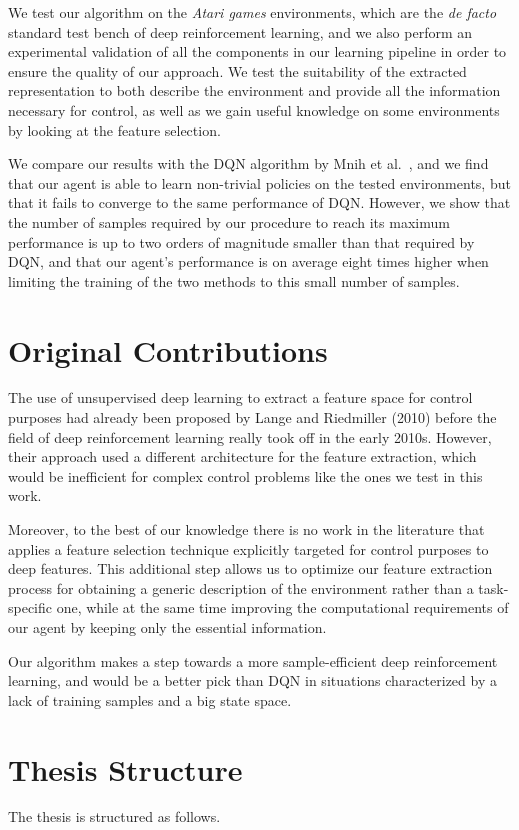 We test our algorithm on the \textit{Atari games} environments, which are
the \textit{de facto} standard test bench of deep reinforcement learning, and we 
also perform an experimental validation of all the components in our learning 
pipeline in order to ensure the quality of our approach.
We test the suitability of the extracted representation to both describe the 
environment and provide all the information necessary for control, as well as 
we gain useful knowledge on some environments by looking at the feature 
selection.

We compare our results with the DQN algorithm by Mnih et al.\ \cite{mnih2015human},
and we find that our agent is able to learn non-trivial policies on the tested 
environments, but that it fails to converge to the same performance of DQN. 
However, we show that the number of samples required by our procedure to reach 
its maximum performance is up to two orders of magnitude smaller than that 
required by DQN, and that our agent's performance is on average eight times 
higher when limiting the training of the two methods to this small number of 
samples.

\section{Original Contributions}
The use of unsupervised deep learning to extract a feature space for control 
purposes had already been proposed by Lange and Riedmiller (2010) \cite{lange2010deep} 
before the field of deep reinforcement learning really took off in the early 
2010s. 
However, their approach used a different architecture for the feature extraction, 
which would be inefficient for complex control problems like the ones we test
in this work. 

Moreover, to the best of our knowledge there is no work in the literature that
applies a feature selection technique explicitly targeted for control purposes
to deep features. 
This additional step allows us to optimize our feature extraction process for 
obtaining a generic description of the environment rather than a task-specific 
one, while at the same time improving the computational requirements of our 
agent by keeping only the essential information. 

Our algorithm makes a step towards a more sample-efficient deep reinforcement 
learning, and would be a better pick than DQN in situations characterized by a 
lack of training samples and a big state space. 

\section{Thesis Structure}
The thesis is structured as follows. 


